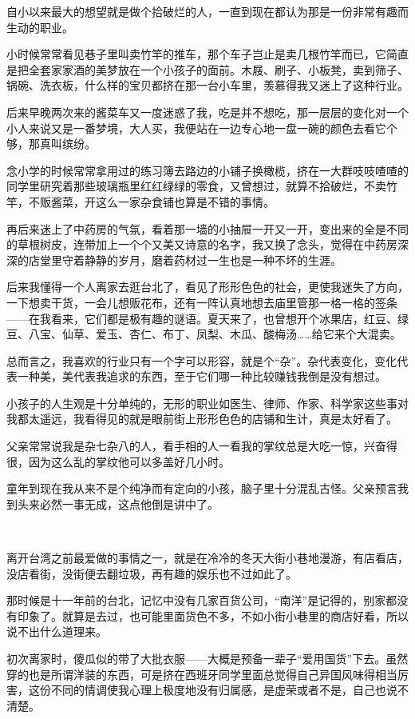 \par 自小以来最大的想望就是做个拾破烂的人，一直到现在都认为那是一份非常有趣而生动的职业。
\par 小时候常常看见巷子里叫卖竹竿的推车，那个车子岂止是卖几根竹竿而已，它简直是把全套家家酒的美梦放在一个小孩子的面前。木屐、刷子、小板凳，卖到筛子、锅碗、洗衣板，什么样的宝贝都挤在那一台小车里，羡慕得我又迷上了这种行业。
\par 后来早晚两次来的酱菜车又一度迷惑了我，吃是并不想吃，那一层层的变化对一个小人来说又是一番梦境，大人买，我便站在一边专心地一盘一碗的颜色去看它个够，那真叫缤纷。
\par 念小学的时候常常拿用过的练习簿去路边的小铺子换橄榄，挤在一大群吱吱喳喳的同学里研究着那些玻璃瓶里红红绿绿的零食，又曾想过，就算不拾破烂，不卖竹竿，不贩酱菜，开这么一家杂食铺也算是不错的事情。
\par 再后来迷上了中药房的气氛，看着那一墙的小抽屉一开又一开，变出来的全是不同的草根树皮，连带加上一个个又美又诗意的名字，我又换了念头，觉得在中药房深深的店堂里守着静静的岁月，磨着药材过一生也是一种不坏的生涯。
\par 后来我懂得一个人离家去逛台北了，看见了形形色色的社会，更使我迷失了方向，一下想卖干货，一会儿想贩花布，还有一阵认真地想去庙里管那一格一格的签条——在我看来，它们都是极有趣的谜语。夏天来了，也曾想开个冰果店，红豆、绿豆、八宝、仙草、爱玉、杏仁、布丁、凤梨、木瓜、酸梅汤……给它来个大混卖。
\par 总而言之，我喜欢的行业只有一个字可以形容，就是个“杂”。杂代表变化，变化代表一种美，美代表我追求的东西，至于它们哪一种比较赚钱我倒是没有想过。
\par 小孩子的人生观是十分单纯的，无形的职业如医生、律师、作家、科学家这些事对我都太遥远，我看得见的就是眼前街上形形色色的店铺和生计，真是太好看了。
\par 父亲常常说我是杂七杂八的人，看手相的人一看我的掌纹总是大吃一惊，兴奋得很，因为这么乱的掌纹他可以多盖好几小时。
\par 童年到现在我从来不是个纯净而有定向的小孩，脑子里十分混乱古怪。父亲预言我到头来必然一事无成，这点他倒是讲中了。
\par  
\par 离开台湾之前最爱做的事情之一，就是在冷冷的冬天大街小巷地漫游，有店看店，没店看街，没街便去翻垃圾，再有趣的娱乐也不过如此了。
\par 那时候是十一年前的台北，记忆中没有几家百货公司，“南洋”是记得的，别家都没有印象了。就算是去过，也可能里面货色不多，不如小街小巷里的商店好看，所以说不出什么道理来。
\par 初次离家时，傻瓜似的带了大批衣服——大概是预备一辈子“爱用国货”下去。虽然穿的也是所谓洋装的东西，可是挤在西班牙同学里面总觉得自己异国风味得相当厉害，这份不同的情调使我心理上极度地没有归属感，是虚荣或者不是，自己也说不清楚。
